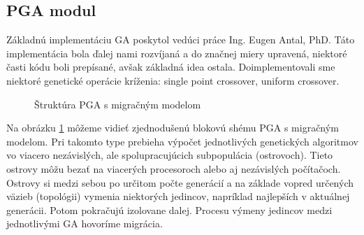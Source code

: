 \subsection{PGA modul}
Základnú implementáciu GA poskytol vedúci práce Ing. Eugen Antal, PhD.
Táto implementácia bola ďalej nami rozvíjaná a do značnej miery upravená, niektoré časti kódu boli prepísané, avšak základná idea ostala.
Doimplementovali sme niektoré genetické operácie kríženia: single point crossover, uniform crossover.

\begin{figure}[!htbp]
  \centering
  
  \caption{Štruktúra PGA s migračným modelom}
  \label{img:pga}
\end{figure}

Na obrázku \ref{img:pga} môžeme vidieť zjednodušenú blokovú shému PGA s migračným modelom.
Pri takomto type prebieha výpočet jednotlivých genetických algoritmov vo viacero nezávislých, ale spolupracujúcich subpopulácia (ostrovoch).
Tieto ostrovy môžu bezať na viacerých procesoroch alebo aj nezávislých počítačoch.
Ostrovy si medzi sebou po určitom počte generácií a na základe vopred určených väzieb (topológii) vymenia niektorých jedincov,
napríklad najlepších v aktuálnej generácii. Potom pokračujú izolovane dalej.
Procesu výmeny jedincov medzi jednotlivými GA hovoríme migrácia.

